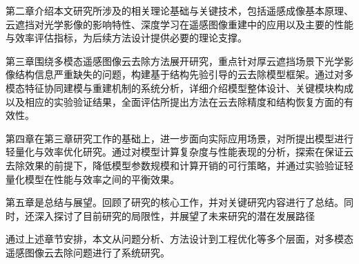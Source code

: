 第二章介绍本文研究所涉及的相关理论基础与关键技术，包括遥感成像基本原理、云遮挡对光学影像的影响特性、深度学习在遥感图像重建中的应用以及主要的性能与效率评估指标，为后续方法设计提供必要的理论支撑。

第三章围绕多模态遥感图像云去除方法展开研究，重点针对厚云遮挡场景下光学影像结构信息严重缺失的问题，构建基于结构先验引导的云去除模型框架。通过对多模态特征协同建模与重建机制的系统分析，详细介绍模型整体设计、关键模块构成以及相应的实验验证结果，全面评估所提出方法在云去除精度和结构恢复方面的有效性。

第四章在第三章研究工作的基础上，进一步面向实际应用场景，对所提出模型进行轻量化与效率优化研究。通过对模型计算复杂度与性能表现的分析，探索在保证云去除效果的前提下，降低模型参数规模和计算开销的可行策略，并通过实验验证轻量化模型在性能与效率之间的平衡效果。

第五章是总结与展望。回顾了研究的核心工作，并对关键研究内容进行了总结。同时，还深入探讨了目前研究的局限性，并展望了未来研究的潜在发展路径

通过上述章节安排，本文从问题分析、方法设计到工程优化等多个层面，对多模态遥感图像云去除问题进行了系统研究。



\clearpage